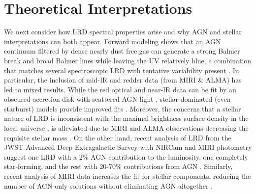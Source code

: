 \documentclass[utf8]{FrontiersinHarvard} %
\begin{document}
\section{Theoretical Interpretations}
\label{sec:interp}
We next consider how LRD spectral properties arise and why AGN and stellar interpretations can both appear.
Forward modeling shows that an AGN continuum filtered by dense nearly dust free gas can generate a strong Balmer break and broad Balmer lines while leaving the UV relatively blue, a combination that matches several spectroscopic LRD with tentative variability present \citep[2.6$\sigma$;][]{d2025blackthunder}. 
In particular, the inclusion of mid-IR and redder data (from MIRI \& ALMA) has led to mixed results. 
While the red optical and near-IR data can be fit by an obscured accretion disk with scattered AGN light \citep{lambrides2024case,pacucci2024mildly,madau2025chasing}, stellar-dominated (even starburst) models provide improved fits \citep{perez2024nature,carranzaEscudero2025lonely}. 
Moreover, the concerns that a stellar nature of LRD is inconsistent with the maximal brightness surface density in the local universe \citep{hopkins2010maximum}, is alleviated due to MIRI and ALMA observations decreasing the requisite stellar mass \citep{williams2024galaxies}. 
On the other hand, recent analysis of LRD from the
JWST Advanced Deep Extragalactic Survey \citep[JADES;][]{eisenstein2023overview}
with NIRCam and MIRI photometry suggest one LRD with a 2\% AGN contribution to the luminosity, one completely star-forming, and the rest with 20-70\% contributions from AGN \citep{durodola2025exploring}. 
Similarly, recent analysis of MIRI data increases the fit for stellar components, reducing the number of AGN-only solutions without eliminating AGN altogether \citep{furtak2025investigating}. 
\end{document}
